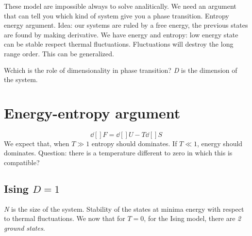\documentclass[../main/main.tex]{subfiles}
\begin{document}

These model are impossible always to solve analitically. We need an argument that can tell you which kind of system give you a phase transition.
Entropy energy argument. Idea: our systems are ruled by a free energy, the previous states are found by making derivative. We have energy and entropy: low energy state can be stable respect thermal fluctuations. Fluctuations will destroy the long range order. This can be generalized.

Wchich is the role of dimensionality in phase transition? \emph{D} is the dimension of the system.
\section{Energy-entropy argument}
\begin{equation}
  \dd[]{F} = \dd[]{U} - T \dd[]{S}
\end{equation}
We expect that, when \( T \gg 1\) entropy should dominates. If \( T \ll 1 \), energy should dominates. Question: there is a temperature different to zero in which this is compatible?

\subsection{Ising \( D=1 \) }
\emph{N} is the size of the system.
Stability of the states at minima energy with respect to thermal fluctuations. We now that for \( T=0 \), for the Ising model, there are \emph{2 ground states}.
\end{document}
